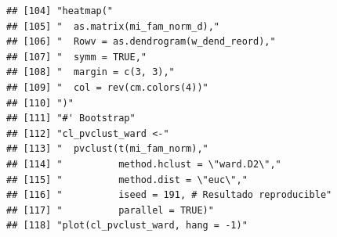 \documentclass[11pt,]{article}
\begin{document}
\begin{verbatim}
## [104] "heatmap("                                                                                                                                                              
## [105] "  as.matrix(mi_fam_norm_d),"                                                                                                                                           
## [106] "  Rowv = as.dendrogram(w_dend_reord),"                                                                                                                                 
## [107] "  symm = TRUE,"                                                                                                                                                        
## [108] "  margin = c(3, 3),"                                                                                                                                                   
## [109] "  col = rev(cm.colors(4))"                                                                                                                                             
## [110] ")"                                                                                                                                                                     
## [111] "#' Bootstrap"                                                                                                                                                          
## [112] "cl_pvclust_ward <-"                                                                                                                                                    
## [113] "  pvclust(t(mi_fam_norm),"                                                                                                                                             
## [114] "          method.hclust = \"ward.D2\","                                                                                                                                
## [115] "          method.dist = \"euc\","                                                                                                                                      
## [116] "          iseed = 191, # Resultado reproducible"                                                                                                                       
## [117] "          parallel = TRUE)"                                                                                                                                            
## [118] "plot(cl_pvclust_ward, hang = -1)"                                                                                                                                      

\end{verbatim}
\end{document}
